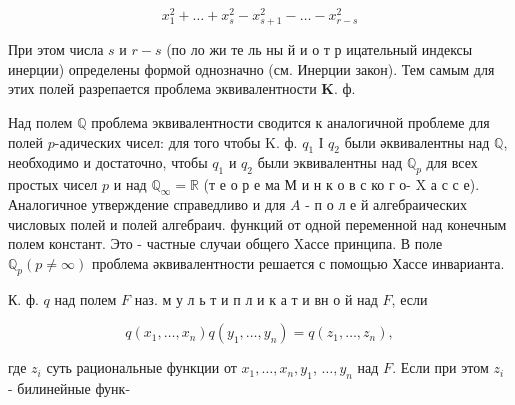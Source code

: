 \documentclass[10pt]{article}
\begin{document}
\[

x_{1}^{2}+\ldots+x_{s}^{2}-x_{s+1}^{2}-\ldots-x_{r-s}^{2}

\]



При этом числа $s$ и $r-s$ (по ло жи те ль ны й и о т р ицательный индексы инерции) определены формой однозначно (см. Инерции закон). Тем самым для этих полей разрепается проблема эквивалентности $\boldsymbol{K}$. ф.



Над полем $\mathbb{Q}$ проблема эквивалентности сводится к аналогичной проблеме для полей $p$-адических чисел: для того чтобы $\mathrm{K}$. ф. $q_{1}$ І $q_{2}$ были әквивалентны над $\mathbb{Q}$, необходимо и достаточно, чтобы $q_{1}$ и $q_{2}$ были эквивалентны над $\mathbb{Q}_{p}$ для всех простых чисел $p$ и над $\mathbb{Q}_{\infty}=\mathbb{R}$ (т е о р е ма М и н к о в с ко г о- $\mathrm{X}$ а с с е). Аналогичное утверждение справедливо и для $A$ - п о л е й алгебраических числовых полей и полей алгебраич. функций от одной переменной над конечным полем констант. Это - частные случаи общего Xассе принципа. В поле $\mathbb{Q}_{p}(p \neq \infty)$ проблема әквивалентности решается с помощью Хассе инварианта.



К. ф. $q$ над полем $F$ наз. м у л ь т и п л и к а т и вн о й над $F$, если



\[

q\left(x_{1}, \ldots, x_{n}\right) q\left(y_{1}, \ldots, y_{n}\right)=q\left(z_{1}, \ldots, z_{n}\right),

\]



где $z_{i}$ суть рациональные функции от $x_{1}, \ldots, x_{n}, y_{1}$, $\ldots, y_{n}$ над $F$. Если при этом $z_{i}$ - билинейные функ-
\end{document}
